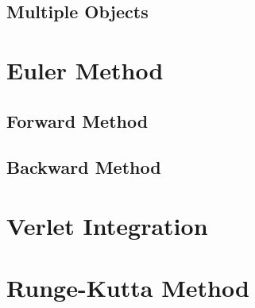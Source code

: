 \subsection{Multiple Objects}

\section{Euler Method}
\subsection{Forward Method}
\subsection{Backward Method}

\section{Verlet Integration}

\section{Runge-Kutta Method}
